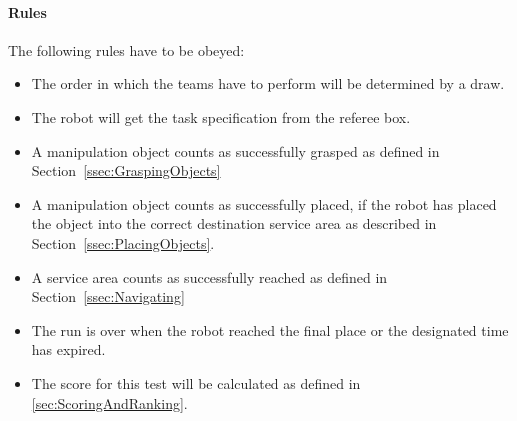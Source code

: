  \paragraph{Rules}
 The following rules have to be obeyed:

 \begin{itemize}
 \item The order in which the teams have to perform will be determined by a draw.
 \item The robot will get the task specification from the referee box.
 \item A manipulation object counts as successfully grasped as defined in Section~\ref{ssec:GraspingObjects}
 \item A manipulation object counts as successfully placed, if the robot has placed the object into the correct destination service area as described in Section~\ref{ssec:PlacingObjects}.
 \item A service area counts as successfully reached as defined in Section~\ref{ssec:Navigating}
 \item  The run is over when the robot reached the final place or the designated time has expired.
 \item The score for this test will be calculated as defined in \ref{sec:ScoringAndRanking}.
 \end{itemize}


